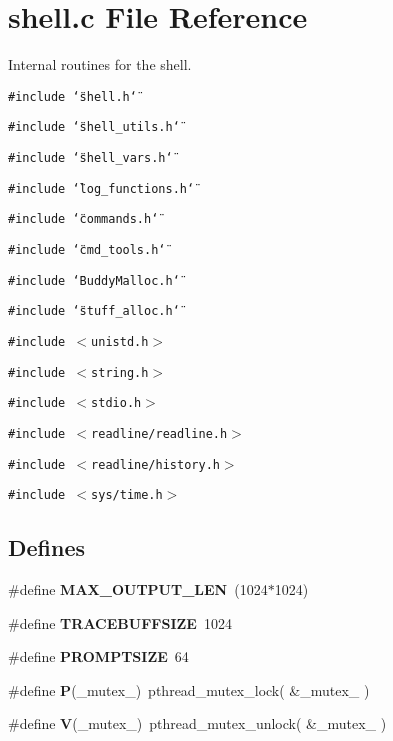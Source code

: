 \section{shell.c File Reference}
\label{shell_8c}
Internal routines for the shell. 

{\tt \#include \char`\"{}shell.h\char`\"{}}\par
{\tt \#include \char`\"{}shell\_\-utils.h\char`\"{}}\par
{\tt \#include \char`\"{}shell\_\-vars.h\char`\"{}}\par
{\tt \#include \char`\"{}log\_\-functions.h\char`\"{}}\par
{\tt \#include \char`\"{}commands.h\char`\"{}}\par
{\tt \#include \char`\"{}cmd\_\-tools.h\char`\"{}}\par
{\tt \#include \char`\"{}Buddy\-Malloc.h\char`\"{}}\par
{\tt \#include \char`\"{}stuff\_\-alloc.h\char`\"{}}\par
{\tt \#include $<$unistd.h$>$}\par
{\tt \#include $<$string.h$>$}\par
{\tt \#include $<$stdio.h$>$}\par
{\tt \#include $<$readline/readline.h$>$}\par
{\tt \#include $<$readline/history.h$>$}\par
{\tt \#include $<$sys/time.h$>$}\par
\subsection*{Defines}
\begin{CompactItemize}
\item 
\#define {\bf MAX\_\-OUTPUT\_\-LEN}\ (1024$\ast$1024)
\item 
\#define {\bf TRACEBUFFSIZE}\ 1024
\item 
\#define {\bf PROMPTSIZE}\ 64
\item 
\#define {\bf P}(\_\-mutex\_\-)\ pthread\_\-mutex\_\-lock( \&\_\-mutex\_\- )
\item 
\#define {\bf V}(\_\-mutex\_\-)\ pthread\_\-mutex\_\-unlock( \&\_\-mutex\_\- )
\end{CompactItemize}

